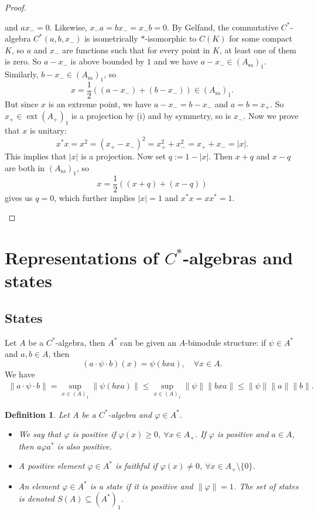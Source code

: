 \documentclass[10pt, a4paper]{article}
\newtheorem{defi}[thm]{Definition}
\newenvironment{noticeB}{%
  \tcolorbox[%
  notitle,
  empty,
  enhanced,  %
  breakable,
  coltext=black,
  colback=white, 
  fontupper=\rmfamily,
  noparskip,
  sharp corners,
  boxrule=-1pt,  %
  frame hidden,
  left=7pt,  %
  right=7pt,
  top=5pt,
  bottom=5pt,
  before skip=2.5ex plus 2pt,
  after skip=2.5ex plus 2pt,
  borderline west = {1.5pt}{-0.1pt}{blue!30!black}, %
  overlay unbroken and last={%
    \draw[color=black, line width=1.25pt]
    ($(frame.south west)+(1.pt, -0.1pt)$) -- ++(2em, 0);
  }
  ]}
{\endtcolorbox}
\newenvironment{definition}{\begin{noticeB}\begin{defi}}{%
    \end{defi}\end{noticeB}}
\newenvironment{noticeC}{%
  \tcolorbox[%
  notitle,
  empty,
  enhanced,  %
  breakable,
  coltext=black, 
  fontupper=\rmfamily,
  noparskip,
  sharp corners,
  boxrule=-1pt,  %
  frame hidden,
  left=7pt,  %
  right=7pt,
  top=5pt,
  bottom=5pt,
  before skip=2.5ex plus 2pt,
  after skip=2.5ex plus 2pt,
  overlay unbroken and last={%
  },
  ]}
{\endtcolorbox}
\newenvironment{myproof}%
  {\begin{noticeC}\begin{proof}}%
  {\end{proof}\end{noticeC}}
\DeclareMathOperator{\ext}{ext}
\DeclareMathOperator{\sa}{sa}
\begin{document}
\begin{myproof}
\begin{enumerate}
    and $a x_- = 0$. Likewise, $x_- a = b x_- = x_- b = 0$. By Gelfand, the commutative $C^*$-algebra $C^*(a, b, x_-)$
    is isometrically $*$-isomorphic to $C(K)$ for some compact $K$, so $a$ and $x_-$ are functions such that for every point in $K$,
    at least one of them is zero. So $a - x_-$ is above bounded by $1$ and we have $a - x_- \in (A_{\sa})_1$.
    Similarly, $b - x_- \in (A_{\sa})_1$, so $$x = \frac{1}{2}((a - x_-) + (b - x_-)) \in (A_{\sa})_1.$$
    But since $x$ is an extreme point, we have $a - x_- = b - x_-$ and $a = b = x_+$.
    So $x_+ \in \ext (A_+)_1$ is a projection by (i) and by symmetry, so is $x_-$. Now we prove that $x$ is unitary:
    $$x^* x = x^2 = (x_+ - x_-)^2 = x_+ ^2 + x_- ^2 = x_+ + x_- = |x|.$$
    This implies that $|x|$ is a projection. Now set $q := 1 - |x|$.
    Then $x + q$ and $x - q$ are both in $(A_{\sa})_1$, so 
    $$x = \frac{1}{2} ((x + q) + (x - q))$$
    gives us $q = 0$, which further implies $|x| = 1$ and $x^* x = x x^* = 1$. \qedhere
  \end{enumerate}
\end{myproof}

\section{Representations of $C^*$-algebras and states}

\subsection{States}

Let $A$ be a $C^*$-algebra, then $A^*$ can be given an $A$-bimodule 
structure: if $\psi \in A^*$ and $a, b \in A$, then 
$$(a \cdot \psi \cdot b)(x) = \psi(bxa),\quad \forall x \in A.$$
We have 
\begin{align*}
  \| a \cdot \psi \cdot b\| = \sup_{x \in (A)_1} \| \psi (bxa)\| \leq \sup_{x \in (A)_1} \| \psi \| \|bxa\| \leq \| \psi\| \| a\| \|b\|.
\end{align*}

\begin{definition}
  Let $A$ be a $C^*$-algebra and $\varphi \in A^*$.
  \begin{itemize}
    \item We say that $\varphi$ is positive if $\varphi(x) \geq 0$, $\forall x \in A_+$.
    If $\varphi$ is positive and $a \in A$, then $a \varphi a^*$ is also positive.
    \item A positive element $\varphi \in A^*$ is faithful if $\varphi(x) \neq 0$, $\forall x \in A_+ \setminus \{0\}$.
    \item An element $\varphi \in A^*$ is a state if it is positive and $\| \varphi \| = 1$.
    The set of states is denoted $S(A) \subseteq (A^*)_1$.
  \end{itemize}
\end{definition}
\end{document}
